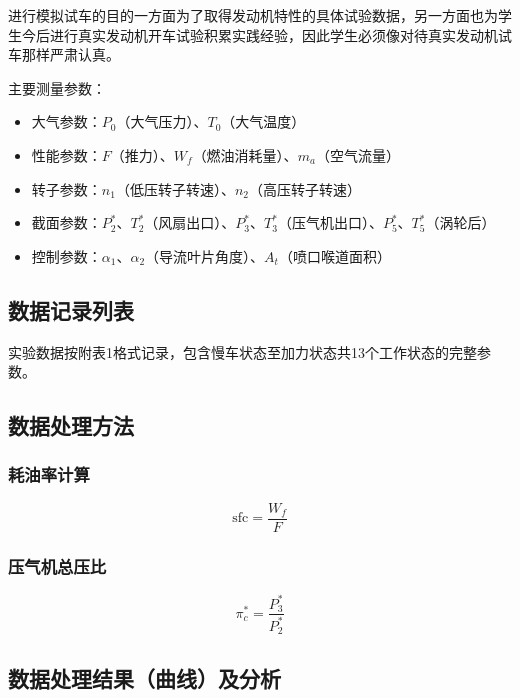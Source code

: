 进行模拟试车的目的一方面为了取得发动机特性的具体试验数据，另一方面也为学生今后进行真实发动机开车试验积累实践经验，因此学生必须像对待真实发动机试车那样严肃认真。

主要测量参数：
\begin{itemize}
    \item 大气参数：$P_0$（大气压力）、$T_0$（大气温度）
    \item 性能参数：$F$（推力）、$W_f$（燃油消耗量）、$m_a$（空气流量）
    \item 转子参数：$n_1$（低压转子转速）、$n_2$（高压转子转速）
    \item 截面参数：$P_2^*$、$T_2^*$（风扇出口）、$P_3^*$、$T_3^*$（压气机出口）、$P_5^*$、$T_5^*$（涡轮后）
    \item 控制参数：$\alpha_1$、$\alpha_2$（导流叶片角度）、$A_t$（喷口喉道面积）
\end{itemize}

\subsection{数据记录列表}

实验数据按附表1格式记录，包含慢车状态至加力状态共13个工作状态的完整参数。



\subsection{数据处理方法}

\subsubsection{耗油率计算}

\begin{equation}
    \text{sfc} = \frac{W_f}{F}
\end{equation}

\subsubsection{压气机总压比}

\begin{equation}
    \pi_c^* = \frac{P_3^*}{P_2^*}
\end{equation}

\subsection{数据处理结果（曲线）及分析}

